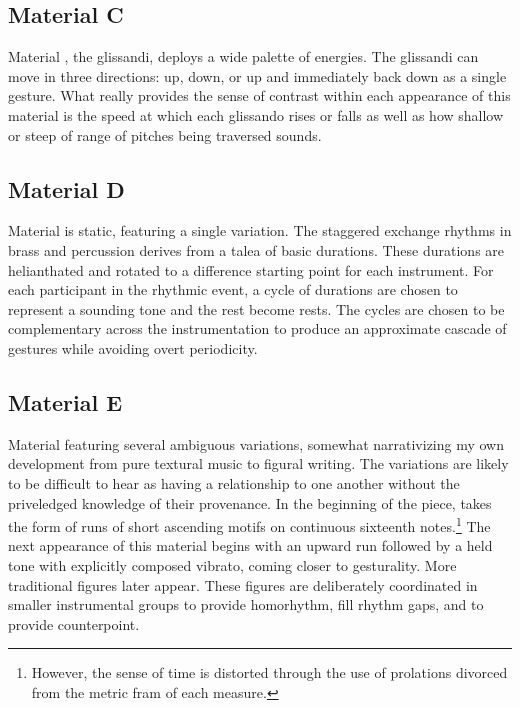 \subsection{Material C}

Material , the glissandi, deploys a wide palette of energies. The glissandi can move in three directions: up, down, or up and immediately back down as a single gesture. What really provides the sense of contrast within each appearance of this material is the speed at which each glissando rises or falls as well as how shallow or steep of range of pitches being traversed sounds.

\subsection{Material D}

Material  is static, featuring a single variation. The staggered exchange rhythms in brass and percussion derives from a talea of basic durations. These durations are helianthated and rotated to a difference starting point for each instrument. For each participant in the rhythmic event, a cycle of durations are chosen to represent a sounding tone and the rest become rests. The cycles are chosen to be complementary across the instrumentation to produce an approximate cascade of gestures while avoiding overt periodicity.

\subsection{Material E}

Material  featuring several ambiguous variations, somewhat narrativizing my own development from pure textural music to figural writing. The variations are likely to be difficult to hear as having a relationship to one another without the priveledged knowledge of their provenance. In the beginning of the piece,  takes the form of runs of short ascending motifs on continuous sixteenth notes.\footnote{However, the sense of time is distorted through the use of prolations divorced from the metric fram of each measure.} The next appearance of this material begins with an upward run followed by a held tone with explicitly composed vibrato, coming closer to gesturality. More traditional figures later appear. These figures are deliberately coordinated in smaller instrumental groups to provide homorhythm, fill rhythm gaps, and to provide counterpoint.

